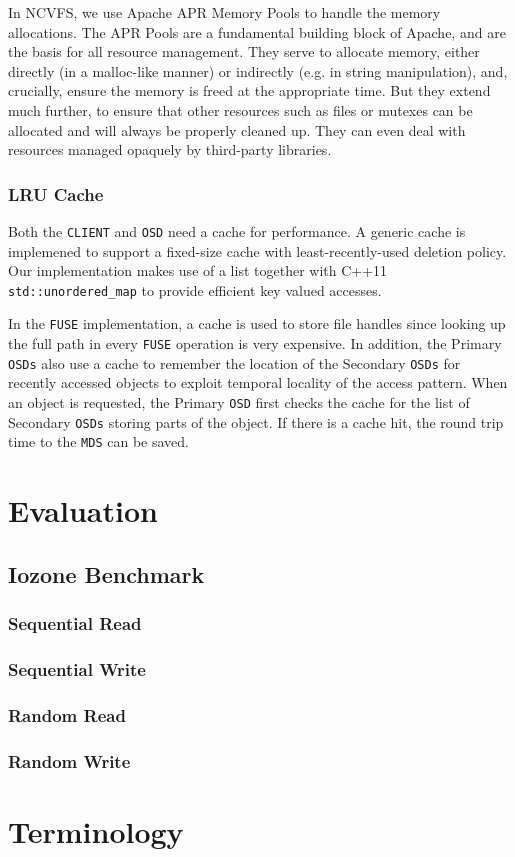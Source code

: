 \documentclass{article}
\def\osd{\texttt{OSD} }
\def\osds{\texttt{OSDs} }
\def\mds{\texttt{MDS} }
\def\fuse{\texttt{FUSE} }
\def\client{\texttt{CLIENT} }
\begin{document}
In NCVFS, we use Apache APR Memory Pools to handle the memory allocations. 
The APR Pools are a fundamental building block of Apache, and are the basis for all resource management. 
They serve to allocate memory, either directly (in a malloc-like manner) or indirectly (e.g. in string manipulation), and, crucially, 
ensure the memory is freed at the appropriate time. 
But they extend much further, to ensure that other resources such as files or mutexes can be allocated and will always be properly cleaned up. 
They can even deal with resources managed opaquely by third-party libraries.

\subsubsection{LRU Cache}

Both the \client and \osd need a cache for performance. A generic cache is implemened to support 
a fixed-size cache with least-recently-used deletion policy. Our implementation makes use of a list
together with C++11 \texttt{std::unordered\_map} to provide efficient key valued accesses.

In the \fuse implementation, a cache is 
used to store file handles since looking up the full path in every \fuse operation is very expensive. In addition, the Primary \osds also use a cache to remember the location of the
Secondary \osds for recently accessed objects to exploit temporal locality of the access pattern.
When an object is requested, the Primary \osd first checks the cache for the list of Secondary 
\osds storing parts of the object. If there is a cache hit, the round trip time to the \mds can be
saved.

\section{Evaluation}

\subsection{Iozone Benchmark}

\subsubsection{Sequential Read}

\subsubsection{Sequential Write}

\subsubsection{Random Read}

\subsubsection{Random Write}

\section*{Terminology}

\newpage


\end{document}
